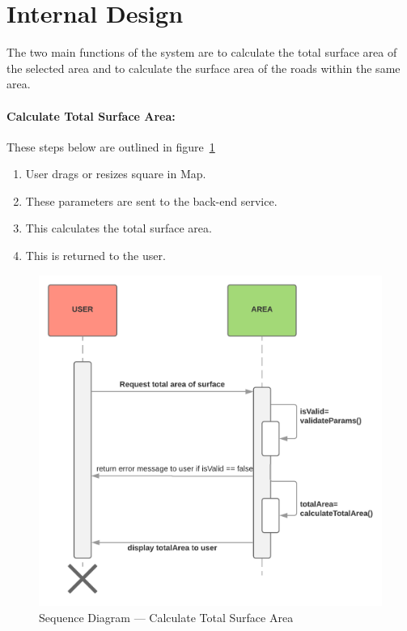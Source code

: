 \documentclass[a4paper,11pt]{article}
\begin{document}
\section{Internal Design}

The two main functions of the system are to calculate the total surface area of
the selected area and to calculate the surface area of the roads within the same
area.

\paragraph{Calculate Total Surface Area:}

These steps below are outlined in figure~\ref{fig:seq-total-area}

\begin{enumerate}
  \item User drags or resizes square in Map.
  \item These parameters are sent to the back-end service.
  \item This calculates the total surface area.
  \item This is returned to the user.
\end{enumerate}

\begin{figure}[H]
  \includegraphics[width=\textwidth]{sequence-diagram-calculate-total-surface-area}
  \caption{Sequence Diagram --- Calculate Total Surface
  Area}\label{fig:seq-total-area}
\end{figure}
\end{document}
